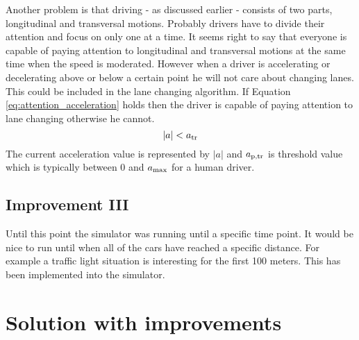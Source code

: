 		 Another problem is that driving - as discussed earlier - consists of two parts, longitudinal and transversal motions. Probably drivers have to divide their attention and focus on only one at a time. It seems right to say that everyone is capable of paying attention to longitudinal and transversal motions at the same time when the speed is moderated. However when a driver is accelerating or decelerating above or below a certain point he will not care about changing lanes. This could be included in the lane changing algorithm. If Equation \ref{eq:attention_acceleration}  holds then the driver is capable of paying attention to lane changing otherwise he cannot.
		\begin{equation}
			|a|<a_{\rm tr}
			\label{eq:attention_acceleration}
		\end{equation}
		The current acceleration value is represented by $|a|$ and $a_{\rm p,tr}$ is threshold value which is typically between 0 and $a_{\rm max}$ for a human driver.
		\subsection*{Improvement III}
		Until this point the simulator was running until a specific time point. It would be nice to run until when all of the cars have reached a specific distance. For example a traffic light situation is interesting for the first 100 meters. This has been implemented into the simulator.
	\section{Solution with improvements}
